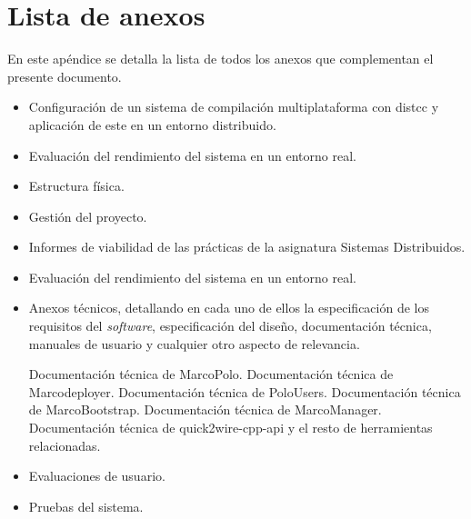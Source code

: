 \chapter{Lista de anexos}
\label{listaanexos}
En este apéndice se detalla la lista de todos los anexos que complementan el presente documento.
\begin{itemize}[noitemsep]
\item Configuración de un sistema de compilación multiplataforma con distcc y aplicación de este en un entorno distribuido.
\item Evaluación del rendimiento del sistema en un entorno real.
\item Estructura física.
\item Gestión del proyecto.
\item Informes de viabilidad de las prácticas de la asignatura Sistemas Distribuidos.
\item Evaluación del rendimiento del sistema en un entorno real.
\item Anexos técnicos, detallando en cada uno de ellos la especificación de los requisitos del \textit{software}, especificación del diseño, documentación técnica, manuales de usuario y cualquier otro aspecto de relevancia.

\subitem Documentación técnica de MarcoPolo.
\subitem Documentación técnica de Marcodeployer.
\subitem Documentación técnica de PoloUsers.
\subitem Documentación técnica de MarcoBootstrap.
\subitem Documentación técnica de MarcoManager.
\subitem Documentación técnica de quick2wire-cpp-api y el resto de herramientas relacionadas.

\item Evaluaciones de usuario.
\item Pruebas del sistema.
\end{itemize}